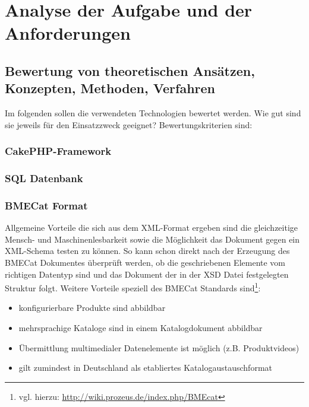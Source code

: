 	
	
	\section{Analyse der Aufgabe und der Anforderungen}
	
	\subsection{Bewertung von theoretischen Ansätzen, Konzepten, Methoden, Verfahren}
		Im folgenden sollen die verwendeten Technologien bewertet werden. 
		Wie gut sind sie jeweils für den Einsatzzweck geeignet?
		Bewertungskriterien sind: 
		
		
	\subsubsection{CakePHP-Framework}
	
	
	
	\subsubsection{SQL Datenbank}
	
	
	\subsubsection{BMECat Format}
	
	Allgemeine Vorteile die sich aus dem XML-Format ergeben sind die gleichzeitige Mensch- und Maschinenlesbarkeit sowie die Möglichkeit das Dokument gegen ein XML-Schema testen zu können. So kann schon direkt nach der Erzeugung des BMECat Dokumentes überprüft werden, ob die geschriebenen Elemente vom richtigen Datentyp sind und das Dokument der in der XSD Datei festgelegten Struktur folgt. Weitere Vorteile speziell des BMECat Standards sind\footnote{vgl. hierzu: \url{http://wiki.prozeus.de/index.php/BMEcat}}:
	
	\begin{itemize}[noitemsep]
	\item konfigurierbare Produkte sind abbildbar
	\item mehrsprachige Kataloge sind in einem Katalogdokument abbildbar
	\item Übermittlung multimedialer Datenelemente ist möglich (z.B. Produktvideos)	
	\item gilt zumindest in Deutschland als etabliertes Katalogaustauschformat	
	\end{itemize}
	
